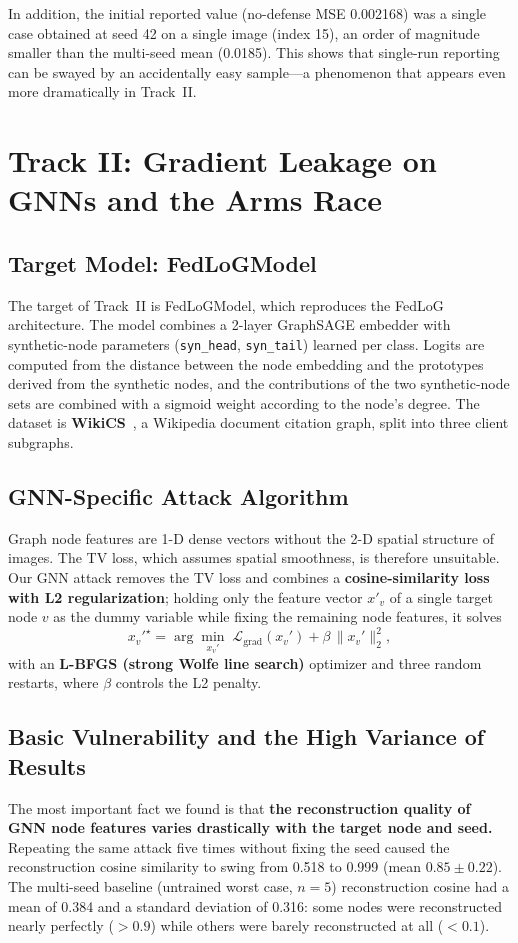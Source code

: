 \documentclass[conference]{IEEEtran}
\begin{document}
In addition, the initial reported value (no-defense MSE 0.002168) was a single
case obtained at seed 42 on a single image (index 15), an order of magnitude
smaller than the multi-seed mean (0.0185). This shows that single-run reporting
can be swayed by an accidentally easy sample---a phenomenon that appears even more
dramatically in Track~II.

\section{Track II: Gradient Leakage on GNNs and the Arms Race}

\subsection{Target Model: FedLoGModel}
The target of Track~II is FedLoGModel, which reproduces the FedLoG architecture.
The model combines a 2-layer GraphSAGE embedder with synthetic-node parameters
(\texttt{syn\_head}, \texttt{syn\_tail}) learned per class. Logits are computed
from the distance between the node embedding and the prototypes derived from the
synthetic nodes, and the contributions of the two synthetic-node sets are
combined with a sigmoid weight according to the node's degree. The dataset is
\textbf{WikiCS}~\cite{mernyei2020wikics}, a Wikipedia document citation graph,
split into three client subgraphs.

\subsection{GNN-Specific Attack Algorithm}
Graph node features are 1-D dense vectors without the 2-D spatial structure of
images. The TV loss, which assumes spatial smoothness, is therefore unsuitable.
Our GNN attack removes the TV loss and combines a \textbf{cosine-similarity loss
with L2 regularization}; holding only the feature vector $x'_v$ of a single
target node $v$ as the dummy variable while fixing the remaining node features,
it solves
\begin{equation}
x_v'^\star=\arg\min_{x_v'}\;\mathcal{L}_{\mathrm{grad}}(x_v')
+\beta\,\|x_v'\|_2^2 ,
\label{eq:gnn_obj}
\end{equation}
with an \textbf{L-BFGS (strong Wolfe line search)} optimizer and three random
restarts, where $\beta$ controls the L2 penalty.

\subsection{Basic Vulnerability and the High Variance of Results}
The most important fact we found is that \textbf{the reconstruction quality of
GNN node features varies drastically with the target node and seed.} Repeating
the same attack five times without fixing the seed caused the reconstruction
cosine similarity to swing from 0.518 to 0.999 (mean $0.85\pm0.22$). The
multi-seed baseline (untrained worst case, $n{=}5$) reconstruction cosine had a
mean of 0.384 and a standard deviation of 0.316: some nodes were reconstructed
nearly perfectly ($>0.9$) while others were barely reconstructed at all ($<0.1$).
\end{document}
